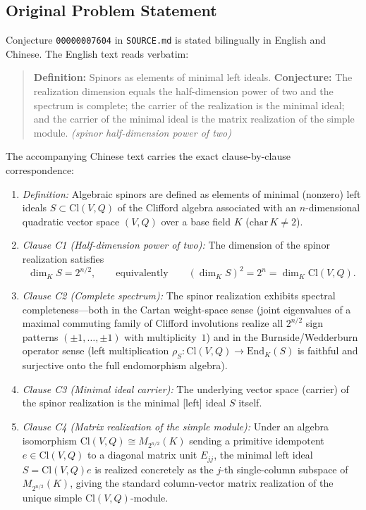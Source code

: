 \documentclass[11pt,a4paper]{article}
\theoremstyle{plain}
\theoremstyle{definition}
\theoremstyle{remark}
\newcommand{\Cl}{\mathrm{Cl}}
\newcommand{\End}{\mathrm{End}}
\begin{document}
\subsection{Original Problem Statement}
Conjecture \texttt{00000007604} in \texttt{SOURCE.md} is stated bilingually in English and Chinese. The English text reads verbatim:
\begin{quote}
\textbf{Definition:} Spinors as elements of minimal left ideals.
\textbf{Conjecture:} The realization dimension equals the half-dimension power of two and the spectrum is complete; the carrier of the realization is the minimal ideal; and the carrier of the minimal ideal is the matrix realization of the simple module. \emph{(spinor half-dimension power of two)}
\end{quote}
The accompanying Chinese text carries the exact clause-by-clause correspondence:
\begin{enumerate}
  \item \emph{Definition:} Algebraic spinors are defined as elements of minimal (nonzero) left ideals $S \subset \Cl(V, Q)$ of the Clifford algebra associated with an $n$-dimensional quadratic vector space $(V, Q)$ over a base field $K$ ($\mathrm{char}\,K \neq 2$).
  \item \emph{Clause C1 (Half-dimension power of two):} The dimension of the spinor realization satisfies
  \begin{equation}\label{eq:half-dim}
    \dim_K S = 2^{n/2}, \qquad \text{equivalently} \qquad (\dim_K S)^2 = 2^n = \dim_K \Cl(V, Q).
  \end{equation}
  \item \emph{Clause C2 (Complete spectrum):} The spinor realization exhibits spectral completeness---both in the Cartan weight-space sense (joint eigenvalues of a maximal commuting family of Clifford involutions realize all $2^{n/2}$ sign patterns $(\pm 1, \dots, \pm 1)$ with multiplicity~$1$) and in the Burnside/Wedderburn operator sense (left multiplication $\rho_S : \Cl(V, Q) \to \End_K(S)$ is faithful and surjective onto the full endomorphism algebra).
  \item \emph{Clause C3 (Minimal ideal carrier):} The underlying vector space (carrier) of the spinor realization is the minimal [left] ideal $S$ itself.
  \item \emph{Clause C4 (Matrix realization of the simple module):} Under an algebra isomorphism $\Cl(V, Q) \cong M_{2^{n/2}}(K)$ sending a primitive idempotent $e \in \Cl(V, Q)$ to a diagonal matrix unit $E_{jj}$, the minimal left ideal $S = \Cl(V, Q) e$ is realized concretely as the $j$-th single-column subspace of $M_{2^{n/2}}(K)$, giving the standard column-vector matrix realization of the unique simple $\Cl(V, Q)$-module.
\end{enumerate}
\end{document}
